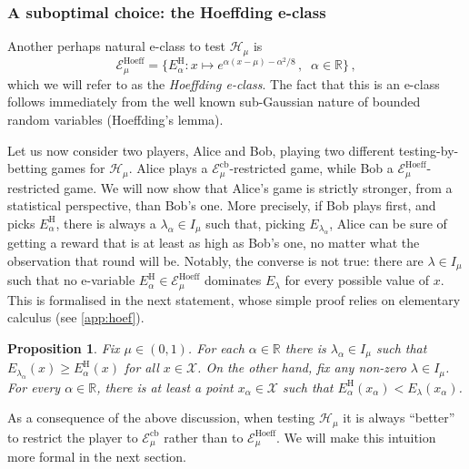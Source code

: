 \documentclass[3p, authoryear, 10pt]{elsarticle}%
\newcommand{\Ecb}{\mathcal E^{\mathrm{cb}}}
\newcommand{\EH}{\mathcal E^{\mathrm{Hoeff}}}
\newcommand{\EHa}{E^{\mathrm{H}}_\alpha}
\newcommand{\Hh}{\mathcal H}
\newcommand{\R}{\mathbb R}
\newcommand{\X}{\mathcal X}
\newtheorem{proposition}{Proposition}
\begin{document}
\subsubsection{A suboptimal choice: the Hoeffding e-class}
Another perhaps natural e-class to test $\Hh_\mu$ is  
$$\EH_\mu = \{\EHa:x\mapsto e^{\alpha(x-\mu)-\alpha^2/8}\,,\;\;\alpha\in\R\}\,,$$
which we will refer to as the \emph{Hoeffding e-class}. The fact that this is an e-class follows immediately from the well known sub-Gaussian nature of bounded random variables (Hoeffding's lemma). 

Let us now consider two players, Alice and Bob, playing two different testing-by-betting games for $\Hh_\mu$. Alice plays a $\Ecb_\mu$-restricted game, while Bob a $\EH_\mu$-restricted game. We will now show that Alice's game is strictly stronger, from a statistical perspective, than Bob's one. More precisely, if Bob plays first, and picks $\EHa$, there is always a $\lambda_\alpha\in I_\mu$ such that, picking $E_{\lambda_\alpha}$,  Alice can be sure of getting a reward that is at least as high as Bob's one, no matter what the observation that round will be. Notably, the converse is not true: there are  $\lambda\in I_\mu$ such that no e-variable $\EHa\in\EH_\mu$  dominates $E_\lambda$ for every possible value of $x$. This is formalised in the next statement, whose simple proof relies on elementary calculus (see \ref{app:hoef}).
\begin{proposition}\label{prop:hoef}
    Fix $\mu\in(0,1)$. For each $\alpha\in\R$ there is $\lambda_\alpha\in I_\mu$ such that $E_{\lambda_\alpha}(x)\geq \EHa(x)$ for all $x\in\X$. On the other hand, fix any non-zero $\lambda\in I_\mu$. For every $\alpha\in\R$, there is at least a point $x_\alpha\in\X$ such that $\EHa(x_\alpha)<E_\lambda(x_\alpha)$.
\end{proposition}
As a consequence of the above discussion, when testing $\Hh_\mu$ it is always ``better'' to restrict the player to $\Ecb_\mu$ rather than to $\EH_\mu$. We will make this intuition more formal in the next section.
\end{document}
